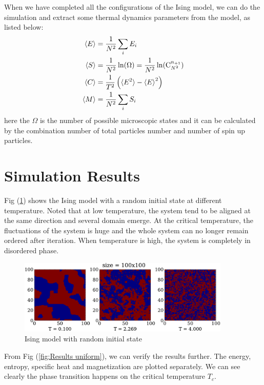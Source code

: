 \documentclass[11pt, a4paper]{article}
\begin{document}
When we have completed all the configurations of the Ising model, we can do the simulation and extract some thermal dynamics parameters from the model, as listed below:
\begin{align}
\braket{E} &= \frac{1}{N^2} \sum\limits_{i} E_i\\
\braket{S} &= \frac{1}{N^2} \ln(\Omega) = \frac{1}{N^2} \ln(\text{C}_{N^2}^{n_{+1}})\\
\braket{C} &= \frac{1}{T^2}\left(\braket{E^2} - \braket{E}^2\right)\\
\braket{M} &= \frac{1}{N^2} \sum\limits_{i} S_i
\end{align}
here the $\Omega$ is the number of possible microscopic states and it can be calculated by the combination number of total particles number and number of spin up particles.

\section{Simulation Results}

Fig (\ref{fig:Results random}) shows the Ising model with a random initial state at different temperature. Noted that at low temperature, the system tend to be aligned at the same direction and several domain emerge. At the critical temperature, the fluctuations of the system is huge and the whole system can no longer remain ordered after iteration. When temperature is high, the system is completely in disordered phase.

\begin{figure}[!h]
\centering
\includegraphics[width=0.9\textwidth]{fig/system-T.pdf}
\caption{Ising model with random initial state}\label{fig:Results random}
\end{figure}

From Fig (\ref{fig:Results uniform}), we can verify the results further. The energy, entropy, specific heat and magnetization are plotted separately. We can see clearly the phase transition happens on the critical temperature $T_c$.
\end{document}
